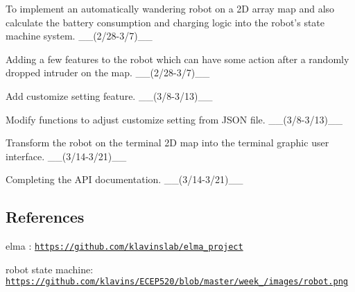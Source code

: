 \begin{DoxyEnumerate}
\item To implement an automatically wandering robot on a 2\+D array map and also calculate the battery consumption and charging logic into the robot's state machine system. \+\_\+\+\_\+(2/28-\/3/7)\+\_\+\+\_\+
\item Adding a few features to the robot which can have some action after a randomly dropped intruder on the map. \+\_\+\+\_\+(2/28-\/3/7)\+\_\+\+\_\+
\item Add customize setting feature. \+\_\+\+\_\+(3/8-\/3/13)\+\_\+\+\_\+
\item Modify functions to adjust customize setting from J\+S\+O\+N file. \+\_\+\+\_\+(3/8-\/3/13)\+\_\+\+\_\+
\item Transform the robot on the terminal 2\+D map into the terminal graphic user interface. \+\_\+\+\_\+(3/14-\/3/21)\+\_\+\+\_\+
\item Completing the A\+P\+I documentation. \+\_\+\+\_\+(3/14-\/3/21)\+\_\+\+\_\+
\end{DoxyEnumerate}

\subsection*{References }


\begin{DoxyItemize}
\item elma \+: \href{https://github.com/klavinslab/elma_project}{\tt https\+://github.\+com/klavinslab/elma\+\_\+project}
\item robot state machine\+: \href{https://github.com/klavins/ECEP520/blob/master/week_7/images/robot.png}{\tt https\+://github.\+com/klavins/\+E\+C\+E\+P520/blob/master/week\+\_/images/robot.\+png} 
\end{DoxyItemize}